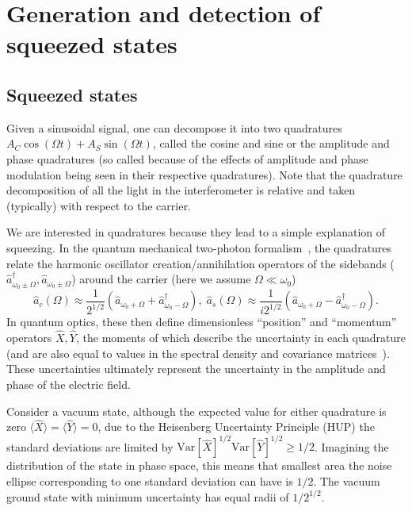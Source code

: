 \documentclass[aps,pra,superscriptaddress,reprint,nofootinbib]{revtex4-1}
\begin{document}
\section{Generation and detection of squeezed states}
\label{sec:squeezing}

\subsection{Squeezed states}

Given a sinusoidal signal, one can decompose it into two quadratures $A_C \cos(\Omega t) + A_S \sin(\Omega t)$, called the cosine and sine or the amplitude and phase quadratures (so called because of the effects of amplitude and phase modulation being seen in their respective quadratures). Note that the quadrature decomposition of all the light in the interferometer is relative and taken (typically) with respect to the carrier.


We are interested in quadratures because they lead to a simple explanation of squeezing. In the quantum mechanical two-photon formalism~\cite{Danilishin_2012}, the quadratures relate the harmonic oscillator creation/annihilation operators of the sidebands ($\hat{a}_{\omega_0 \pm \Omega}^\dagger, \hat{a}_{\omega_0 \pm \Omega}$) around the carrier (here we assume $\Omega \ll \omega_0$) $$\hat{a}_c(\Omega) \approx \frac{1}{2^{1/2}} (\hat{a}_{\omega_0 + \Omega} + \hat{a}_{\omega_0 - \Omega}^\dagger),\; \hat{a}_s(\Omega) \approx \frac{1}{i 2^{1/2}} (\hat{a}_{\omega_0 + \Omega} - \hat{a}_{\omega_0 - \Omega}^\dagger).$$ In quantum optics, these then define dimensionless “position” and “momentum” operators $\hat{X}, \hat{Y}$, the moments of which describe the uncertainty in each quadrature (and are also equal to values in the spectral density and covariance matrices~\cite{Danilishin_2012}). These uncertainties ultimately represent the uncertainty in the amplitude and phase of the electric field.


Consider a vacuum state, although the expected value for either quadrature is zero $\langle \hat{X} \rangle = \langle \hat{Y} \rangle = 0$, due to the Heisenberg Uncertainty Principle (HUP) the standard deviations are limited by $\mathrm{Var}[\hat{X}]^{1/2} \mathrm{Var}[\hat{Y}]^{1/2} \geq 1/2$. Imagining the distribution of the state in phase space, this means that smallest area the noise ellipse corresponding to one standard deviation can have is $1/2$. The vacuum ground state with minimum uncertainty has equal radii of $1/2^{1/2}$.
\end{document}
